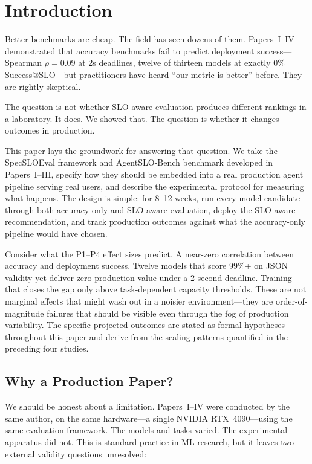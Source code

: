 \documentclass[11pt]{article}
\begin{document}
\section{Introduction}
\label{sec:intro}

Better benchmarks are cheap. The field has seen dozens of them. Papers~I--IV demonstrated that accuracy benchmarks fail to predict deployment success---Spearman $\rho = 0.09$ at 2s deadlines, twelve of thirteen models at exactly 0\% Success@SLO---but practitioners have heard ``our metric is better'' before. They are rightly skeptical.

The question is not whether SLO-aware evaluation produces different rankings in a laboratory. It does. We showed that. The question is whether it changes outcomes in production.

This paper lays the groundwork for answering that question. We take the SpecSLOEval framework and AgentSLO-Bench benchmark developed in Papers~I--III, specify how they should be embedded into a real production agent pipeline serving real users, and describe the experimental protocol for measuring what happens. The design is simple: for 8--12 weeks, run every model candidate through both accuracy-only and SLO-aware evaluation, deploy the SLO-aware recommendation, and track production outcomes against what the accuracy-only pipeline would have chosen.

Consider what the P1--P4 effect sizes predict. A near-zero correlation between accuracy and deployment success. Twelve models that score 99\%+ on JSON validity yet deliver zero production value under a 2-second deadline. Training that closes the gap only above task-dependent capacity thresholds. These are not marginal effects that might wash out in a noisier environment---they are order-of-magnitude failures that should be visible even through the fog of production variability. The specific projected outcomes are stated as formal hypotheses throughout this paper and derive from the scaling patterns quantified in the preceding four studies.

\subsection{Why a Production Paper?}

We should be honest about a limitation. Papers~I--IV were conducted by the same author, on the same hardware---a single NVIDIA RTX~4090---using the same evaluation framework. The models and tasks varied. The experimental apparatus did not. This is standard practice in ML research, but it leaves two external validity questions unresolved:
\end{document}
